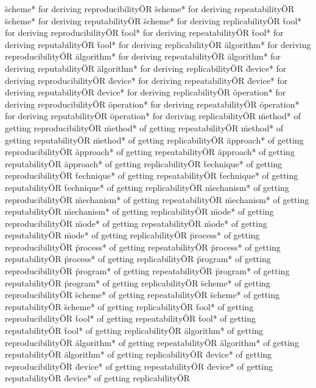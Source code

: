 \documentclass[
10pt, %
a4paper, %
oneside, %
headinclude,footinclude, %
BCOR5mm, %
]{scrartcl}
\begin{document}
\"scheme* for deriving reproducibility\" OR \"scheme* for deriving repeatability\" OR \"scheme* for deriving reputability\" OR \"scheme* for deriving replicability\" OR 
\"tool* for deriving reproducibility\" OR \"tool* for deriving repeatability\" OR \"tool* for deriving reputability\" OR \"tool* for deriving replicability\" OR 
\"algorithm* for deriving reproducibility\" OR \"algorithm* for deriving repeatability\" OR \"algorithm* for deriving reputability\" OR \"algorithm* for deriving replicability\" OR 
\"device* for deriving reproducibility\" OR \"device* for deriving repeatability\" OR \"device* for deriving reputability\" OR \"device* for deriving replicability\" OR 
\"operation* for deriving reproducibility\" OR \"operation* for deriving repeatability\" OR \"operation* for deriving reputability\" OR \"operation* for deriving replicability\" OR 
\"method* of getting reproducibility\" OR \"method* of getting repeatability\" OR \"method* of getting reputability\" OR \"method* of getting replicability\" OR 
\"approach* of getting reproducibility\" OR \"approach* of getting repeatability\" OR \"approach* of getting reputability\" OR \"approach* of getting replicability\" OR 
\"technique* of getting reproducibility\" OR \"technique* of getting repeatability\" OR \"technique* of getting reputability\" OR \"technique* of getting replicability\" OR 
\"mechanism* of getting reproducibility\" OR \"mechanism* of getting repeatability\" OR \"mechanism* of getting reputability\" OR \"mechanism* of getting replicability\" OR 
\"mode* of getting reproducibility\" OR \"mode* of getting repeatability\" OR \"mode* of getting reputability\" OR \"mode* of getting replicability\" OR 
\"process* of getting reproducibility\" OR \"process* of getting repeatability\" OR \"process* of getting reputability\" OR \"process* of getting replicability\" OR 
\"program* of getting reproducibility\" OR \"program* of getting repeatability\" OR \"program* of getting reputability\" OR \"program* of getting replicability\" OR 
\"scheme* of getting reproducibility\" OR \"scheme* of getting repeatability\" OR \"scheme* of getting reputability\" OR \"scheme* of getting replicability\" OR 
\"tool* of getting reproducibility\" OR \"tool* of getting repeatability\" OR \"tool* of getting reputability\" OR \"tool* of getting replicability\" OR 
\"algorithm* of getting reproducibility\" OR \"algorithm* of getting repeatability\" OR \"algorithm* of getting reputability\" OR \"algorithm* of getting replicability\" OR 
\"device* of getting reproducibility\" OR \"device* of getting repeatability\" OR \"device* of getting reputability\" OR \"device* of getting replicability\" OR 
\end{document}
